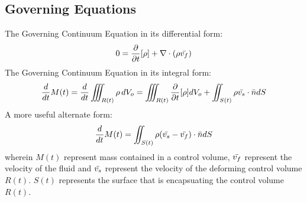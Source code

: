 \documentclass[class=report, 12pt, crop=false]{standalone}
\begin{document}
\begin{center}
\chapter{Governing Equations}
\begin{comment}
\end{comment}
\begin{comment}
Governing Equation: Continuum Equation
\end{comment}
The Governing Continuum Equation in its differential form:
$$0 = \frac{\partial}{\partial t}[\rho] +  \nabla \cdot (\rho\bar{v_f})$$
The Governing Continuum Equation in its integral form:
$$\frac{d}{dt} M(t) = \frac{d}{dt} \iiint_{R(t)} \rho \,dV_o = \iiint_{R(t)}\frac{\partial}{\partial t}[\rho]dV_o + \iint_{S(t)}\rho\bar{v_s}\cdot\bar{n}dS$$
A more useful alternate form:
$$\frac{d}{dt} M(t) = \iint_{S(t)}\rho(\bar{v_s} -\bar{v_f})\cdot\bar{n}dS$$
wherein $M(t)$ represent mass contained in a control volume, $\displaystyle{\bar{v_f}}$ represent the velocity of the fluid and $\displaystyle{\bar{v_s}}$ represent the velocity of the deforming control volume $R(t)$. $S(t)$ represents the surface that is encapsuating the control volume $R(t)$. 

\end{center}
\end{document}
